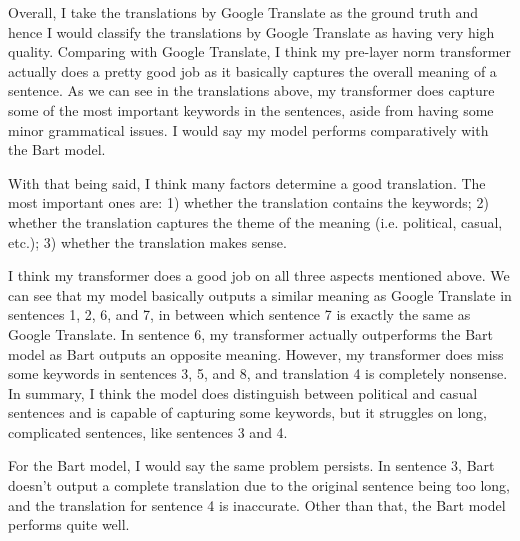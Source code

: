 \documentclass[11pt]{article}
\begin{document}
Overall, I take the translations by Google Translate as the ground truth and hence I would classify the translations by Google Translate as having very high quality. Comparing with Google Translate, I think my pre-layer norm transformer actually does a pretty good job as it basically captures the overall meaning of a sentence. As we can see in the translations above, my transformer does capture some of the most important keywords in the sentences, aside from having some minor grammatical issues. I would say my model performs comparatively with the Bart model.

With that being said, I think many factors determine a good translation. The most important ones are: 1) whether the translation contains the keywords; 2) whether the translation captures the theme of the meaning (i.e. political, casual, etc.); 3) whether the translation makes sense.

I think my transformer does a good job on all three aspects mentioned above. We can see that my model basically outputs a similar meaning as Google Translate in sentences 1, 2, 6, and 7, in between which sentence 7 is exactly the same as Google Translate. In sentence 6, my transformer actually outperforms the Bart model as Bart outputs an opposite meaning. However, my transformer does miss some keywords in sentences 3, 5, and 8, and translation 4 is completely nonsense. In summary, I think the model does distinguish between political and casual sentences and is capable of capturing some keywords, but it struggles on long, complicated sentences, like sentences 3 and 4.

For the Bart model, I would say the same problem persists. In sentence 3, Bart doesn't output a complete translation due to the original sentence being too long, and the translation for sentence 4 is inaccurate. Other than that, the Bart model performs quite well.
\end{document}

